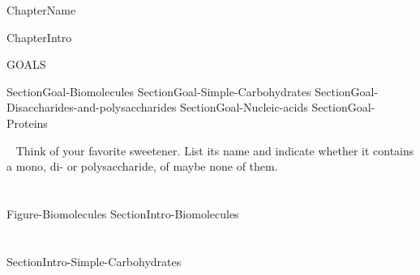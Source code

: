 \documentclass[main.tex]{subfiles}
\newcommand\chapterlabel{Ch-biochemistry}\setcounter{figurenewcounter}{0}\setcounter{tablenewcounter}{0}\setcounter{formulanewcounter}{0}
\begin{document}
 {ChapterName}

\begin{marginfigure}
      \texttt{[image: ../\{\\chapterlabel]}/figure1}
   \end{marginfigure}

 {ChapterIntro}

\begin{marginfigure}%
\begin{mytcbox}{GOALS}

\begin{enumerate}[label=\protect\circled{\color{white}\arabic*}]
 {SectionGoal-Biomolecules}
  {SectionGoal-Simple-Carbohydrates}
 {SectionGoal-Disaccharides-and-polysaccharides}
 {SectionGoal-Nucleic-acids}
 {SectionGoal-Proteins}
\end{enumerate}
\end{mytcbox}
\end{marginfigure}%
\begin{marginfigure}[0.5cm]
\begin{tcolorbox}[enhanced,colback=red!5!white,colframe=black!50!red,boxrule=1pt,
  arc=0pt,outer arc=0pt,drop heavy lifted shadow]
\faGears\ 
 Think of your favorite sweetener. List its name and indicate whether it contains a mono, di- or polysaccharide, of maybe none of them.  \end{tcolorbox}
 \end{marginfigure}


\section{\color{blue!30!black}{Biomolecules}}
  {Figure-Biomolecules}
 {SectionIntro-Biomolecules}
 

\section{\color{blue!30!black}{Simple Carbohydrates}}
{SectionIntro-Simple-Carbohydrates}
\end{document}
